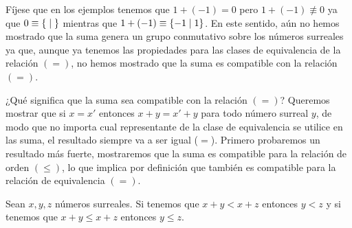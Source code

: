     F\'ijese que en los ejemplos tenemos que $1+(-1) = 0$ pero $1+(-1)\not\equiv 0$ ya que $0\equiv \left\{\;\middle|\; \right\}$ mientras que $1+(-1)\equiv \left\{-1\;\middle|\; 1\right\}$. En este sentido, a\'un no hemos mostrado que la suma genera un grupo conmutativo sobre los n\'umeros surreales ya que, aunque ya tenemos las propiedades para las clases de equivalencia de la relaci\'on $(=)$, no hemos mostrado que la suma es compatible con la relaci\'on $(=)$.
    
    ¿Qué significa que la suma sea compatible con la relaci\'on $(=)$? Queremos mostrar que si $x = x'$ entonces $x+y = x'+y$ para todo n\'umero surreal $y$, de modo que no importa cual representante de la clase de equivalencia se utilice en las suma, el resultado siempre va a ser igual ($=$). Primero probaremos un resultado m\'as fuerte, mostraremos que la suma es compatible para la relaci\'on de orden $(\le)$, lo que implica por definici\'on que tambi\'en es compatible para la relaci\'on de equivalencia $(=)$.

    \begin{theorem}[Cancelaci\'on]
        Sean $x,y, z$ n\'umeros surreales. Si tenemos que $x+y < x+z$ entonces $y < z$ y si tenemos que $x+y\le x+z$ entonces $y\le z$.
    \end{theorem}

